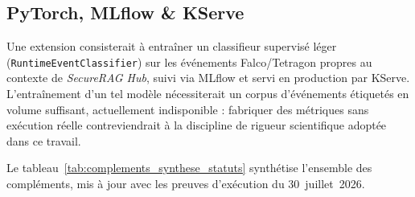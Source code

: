 \subsection{PyTorch, MLflow \& KServe}
Une extension consisterait à entraîner un classifieur supervisé léger (\texttt{RuntimeEventClassifier}) sur les événements Falco/Tetragon propres au contexte de \textit{SecureRAG Hub}, suivi via MLflow et servi en production par KServe. L'entraînement d'un tel modèle nécessiterait un corpus d'événements étiquetés en volume suffisant, actuellement indisponible : fabriquer des métriques sans exécution réelle contreviendrait à la discipline de rigueur scientifique adoptée dans ce travail.

\bigskip
Le tableau~\ref{tab:complements_synthese_statuts} synthétise l'ensemble des compléments, mis à jour avec les preuves d'exécution du 30~juillet~2026.

